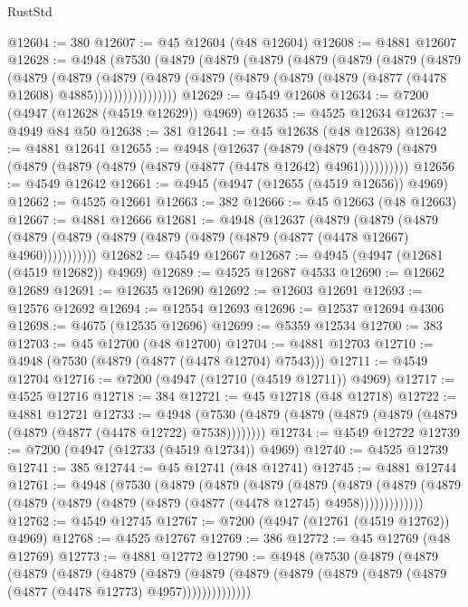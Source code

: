 \begin{lexlean}{RustStd}
\begin{coremodule}
@12604 := 380
@12607 := @45 @12604 (@48 @12604)
@12608 := @4881 @12607
@12628 := @4948
    (@7530
      (@4879
        (@4879
          (@4879
            (@4879
              (@4879
                (@4879
                  (@4879
                    (@4879
                      (@4879
                        (@4879
                          (@4879
                            (@4879 (@4879 (@4879 (@4879 (@4877 (@4478 @12608) @4885)))))))))))))))))
@12629 := @4549 @12608
@12634 := @7200 (@4947 (@12628 (@4519 @12629)) @4969)
@12635 := @4525 @12634
@12637 := @4949 @84 @50
@12638 := 381
@12641 := @45 @12638 (@48 @12638)
@12642 := @4881 @12641
@12655 := @4948
    (@12637
      (@4879 (@4879 (@4879 (@4879 (@4879 (@4879 (@4879 (@4879 (@4877 (@4478 @12642) @4961))))))))))
@12656 := @4549 @12642
@12661 := @4945 (@4947 (@12655 (@4519 @12656)) @4969)
@12662 := @4525 @12661
@12663 := 382
@12666 := @45 @12663 (@48 @12663)
@12667 := @4881 @12666
@12681 := @4948
    (@12637
      (@4879
        (@4879
          (@4879 (@4879 (@4879 (@4879 (@4879 (@4879 (@4879 (@4877 (@4478 @12667) @4960)))))))))))
@12682 := @4549 @12667
@12687 := @4945 (@4947 (@12681 (@4519 @12682)) @4969)
@12689 := @4525 @12687 @4533
@12690 := @12662 @12689
@12691 := @12635 @12690
@12692 := @12603 @12691
@12693 := @12576 @12692
@12694 := @12554 @12693
@12696 := @12537 @12694 @4306
@12698 := @4675 (@12535 @12696)
@12699 := @5359 @12534
@12700 := 383
@12703 := @45 @12700 (@48 @12700)
@12704 := @4881 @12703
@12710 := @4948 (@7530 (@4879 (@4877 (@4478 @12704) @7543)))
@12711 := @4549 @12704
@12716 := @7200 (@4947 (@12710 (@4519 @12711)) @4969)
@12717 := @4525 @12716
@12718 := 384
@12721 := @45 @12718 (@48 @12718)
@12722 := @4881 @12721
@12733 := @4948 (@7530 (@4879 (@4879 (@4879 (@4879 (@4879 (@4879 (@4877 (@4478 @12722) @7538))))))))
@12734 := @4549 @12722
@12739 := @7200 (@4947 (@12733 (@4519 @12734)) @4969)
@12740 := @4525 @12739
@12741 := 385
@12744 := @45 @12741 (@48 @12741)
@12745 := @4881 @12744
@12761 := @4948
    (@7530
      (@4879
        (@4879
          (@4879
            (@4879
              (@4879
                (@4879 (@4879 (@4879 (@4879 (@4879 (@4879 (@4877 (@4478 @12745) @4958)))))))))))))
@12762 := @4549 @12745
@12767 := @7200 (@4947 (@12761 (@4519 @12762)) @4969)
@12768 := @4525 @12767
@12769 := 386
@12772 := @45 @12769 (@48 @12769)
@12773 := @4881 @12772
@12790 := @4948
    (@7530
      (@4879
        (@4879
          (@4879
            (@4879
              (@4879
                (@4879
                  (@4879
                    (@4879 (@4879 (@4879 (@4879 (@4879 (@4877 (@4478 @12773) @4957))))))))))))))

\end{coremodule}
\end{lexlean}
